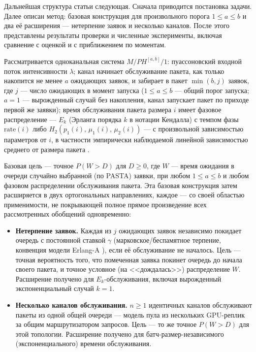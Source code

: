 \documentclass[12pt,a4paper]{article}
\newcommand{\articlesection}[1]{\par\vspace{14pt}{\bfseries #1}\par\vspace{6pt}\nopagebreak}
\begin{document}
Дальнейшая структура статьи следующая. Сначала приводится постановка задачи. Далее описан метод: базовая конструкция для произвольного порога $1\le a\le b$ и два её расширения --- нетерпение заявок и несколько каналов. После этого представлены результаты проверки и численные эксперименты, включая сравнение с оценкой \cite{inoue2021} и с приближением по моментам.

\articlesection{Постановка задачи}

Рассматривается одноканальная система $M/PH^{[a,b]}/1$: пуассоновский входной поток интенсивности $\lambda$; канал начинает обслуживание пакета, как только накопится не менее $a$ ожидающих заявок, и забирает в пакет $\min(b,j)$ заявок, где $j$ --- число ожидающих в момент запуска ($1\le a\le b$ --- общий порог запуска; $a=1$ --- вырожденный случай без накопления, канал запускает пакет по приходе первой же заявки); время обслуживания пакета размера $i$ имеет фазовое распределение --- $E_k$ (Эрланга порядка $k$ в нотации Кендалла) с темпом фазы $\mathrm{rate}(i)$ либо $H_2(p_1(i),\,\mu_1(i),\,\mu_2(i))$ --- с произвольной зависимостью параметров от $i$, в частности эмпирически наблюдаемой линейной зависимостью среднего от размера пакета \cite{inoue2021}.

Базовая цель --- точное $P(W>D)$ для $D\ge 0$, где $W$ --- время ожидания в очереди случайно выбранной (по PASTA) заявки, при любом $1\le a\le b$ и любом фазовом распределении обслуживания пакета. Эта базовая конструкция затем расширяется в двух ортогональных направлениях, каждое --- со своей областью применимости, не покрывающей полное прямое произведение всех рассмотренных обобщений одновременно:

\begin{itemize}
\item[1)] \textbf{Нетерпение заявок.} Каждая из $j$ ожидающих заявок независимо покидает очередь с постоянной ставкой $\gamma$ (марковское/беспамятное терпение, конвенция модели Erlang-A \cite{garnett2002}), если её обслуживание не началось. Цель --- точная вероятность того, что помеченная заявка покинет очередь до начала своего пакета, и точное условное (на <<дождалась>>) распределение $W$. Расширение получено для $E_k$-обслуживания, включая вырожденный экспоненциальный случай $k=1$.
\item[2)] \textbf{Несколько каналов обслуживания.} $n\ge 1$ идентичных каналов обслуживают пакеты из одной общей очереди --- модель пула из нескольких GPU-реплик за общим маршрутизатором запросов. Цель --- то же точное $P(W>D)$ для этой топологии. Расширение получено для батч-размер-независимого (экспоненциального) времени обслуживания.
\end{itemize}
\end{document}
